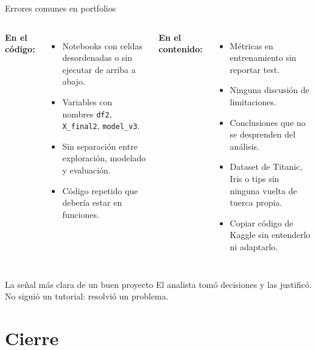 \documentclass[aspectratio=169]{beamer}
\begin{document}
\begin{frame}{Errores comunes en portfolios}
  \begin{columns}
      \textbf{En el código:}
      \begin{itemize}
        \item Notebooks con celdas desordenadas o sin ejecutar de arriba a abajo.
        \item Variables con nombres \texttt{df2}, \texttt{X\_final2}, \texttt{model\_v3}.
        \item Sin separación entre exploración, modelado y evaluación.
        \item Código repetido que debería estar en funciones.
      \end{itemize}
      \textbf{En el contenido:}
      \begin{itemize}
        \item Métricas en entrenamiento sin reportar test.
        \item Ninguna discusión de limitaciones.
        \item Conclusiones que no se desprenden del análisis.
        \item Dataset de Titanic, Iris o tips sin ninguna vuelta de tuerca propia.
        \item Copiar código de Kaggle sin entenderlo ni adaptarlo.
      \end{itemize}
  \end{columns}

  \bigskip
  \begin{alertblock}{La señal más clara de un buen proyecto}
    El analista tomó decisiones y las justificó. No siguió un tutorial: resolvió un problema.
  \end{alertblock}
\end{frame}

\section{Cierre}
\end{document}
